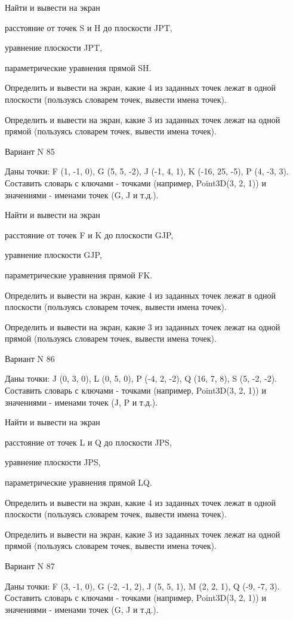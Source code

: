 \documentclass[11pt]{report}
\begin{document}
Найти и вывести на экран


расстояние от точек S и H до плоскости JPT,


уравнение плоскости JPT,


параметрические уравнения прямой SH.


Определить и вывести на экран, какие 4 из заданных точек лежат в одной плоскости (пользуясь словарем точек, вывести имена точек).


Определить и вывести на экран, какие 3 из заданных точек лежат на одной прямой (пользуясь словарем точек, вывести имена точек).

\newpage
Вариант N 85

Даны точки: F (1, -1, 0), G (5, 5, -2), J (-1, 4, 1), K (-16, 25, -5), P (4, -3, 3).
Составить словарь с ключами - точками (например, Point3D(3, 2, 1)) и значениями - именами точек (G, J и т.д.).


Найти и вывести на экран


расстояние от точек F и K до плоскости GJP,


уравнение плоскости GJP,


параметрические уравнения прямой FK.


Определить и вывести на экран, какие 4 из заданных точек лежат в одной плоскости (пользуясь словарем точек, вывести имена точек).


Определить и вывести на экран, какие 3 из заданных точек лежат на одной прямой (пользуясь словарем точек, вывести имена точек).

\newpage
Вариант N 86

Даны точки: J (0, 3, 0), L (0, 5, 0), P (-4, 2, -2), Q (16, 7, 8), S (5, -2, -2).
Составить словарь с ключами - точками (например, Point3D(3, 2, 1)) и значениями - именами точек (J, P и т.д.).


Найти и вывести на экран


расстояние от точек L и Q до плоскости JPS,


уравнение плоскости JPS,


параметрические уравнения прямой LQ.


Определить и вывести на экран, какие 4 из заданных точек лежат в одной плоскости (пользуясь словарем точек, вывести имена точек).


Определить и вывести на экран, какие 3 из заданных точек лежат на одной прямой (пользуясь словарем точек, вывести имена точек).

\newpage
Вариант N 87

Даны точки: F (3, -1, 0), G (-2, -1, 2), J (5, 5, 1), M (2, 2, 1), Q (-9, -7, 3).
Составить словарь с ключами - точками (например, Point3D(3, 2, 1)) и значениями - именами точек (G, J и т.д.).
\end{document}

